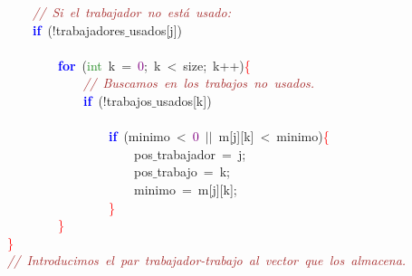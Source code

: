 \mbox{}\ \ \ \ \ \ \ \ \ \ \ \ \textit{\textcolor{Brown}{//\ Si\ el\ trabajador\ no\ está\ usado:\ }} \\
\mbox{}\ \ \ \ \ \ \ \ \ \ \ \ \textbf{\textcolor{Blue}{if}}\ \textcolor{BrickRed}{(!}trabajadores$\_$usados\textcolor{BrickRed}{[}j\textcolor{BrickRed}{])} \\
\mbox{} \\
\mbox{}\ \ \ \ \ \ \ \ \ \ \ \ \ \ \ \ \textbf{\textcolor{Blue}{for}}\ \textcolor{BrickRed}{(}\textcolor{ForestGreen}{int}\ k\ \textcolor{BrickRed}{=}\ \textcolor{Purple}{0}\textcolor{BrickRed}{;}\ k\ \textcolor{BrickRed}{\textless{}}\ size\textcolor{BrickRed}{;}\ k\textcolor{BrickRed}{++)}\textcolor{Red}{\{} \\
\mbox{}\ \ \ \ \ \ \ \ \ \ \ \ \ \ \ \ \ \ \ \ \textit{\textcolor{Brown}{//\ Buscamos\ en\ los\ trabajos\ no\ usados.\ }} \\
\mbox{}\ \ \ \ \ \ \ \ \ \ \ \ \ \ \ \ \ \ \ \ \textbf{\textcolor{Blue}{if}}\ \textcolor{BrickRed}{(!}trabajos$\_$usados\textcolor{BrickRed}{[}k\textcolor{BrickRed}{])} \\
\mbox{} \\
\mbox{}\ \ \ \ \ \ \ \ \ \ \ \ \ \ \ \ \ \ \ \ \ \ \ \ \textbf{\textcolor{Blue}{if}}\ \textcolor{BrickRed}{(}minimo\ \textcolor{BrickRed}{\textless{}}\ \textcolor{Purple}{0}\ \textcolor{BrickRed}{$|$$|$}\ m\textcolor{BrickRed}{[}j\textcolor{BrickRed}{][}k\textcolor{BrickRed}{]}\ \textcolor{BrickRed}{\textless{}}\ minimo\textcolor{BrickRed}{)}\textcolor{Red}{\{} \\
\mbox{}\ \ \ \ \ \ \ \ \ \ \ \ \ \ \ \ \ \ \ \ \ \ \ \ \ \ \ \ pos$\_$trabajador\ \textcolor{BrickRed}{=}\ j\textcolor{BrickRed}{;}\  \\
\mbox{}\ \ \ \ \ \ \ \ \ \ \ \ \ \ \ \ \ \ \ \ \ \ \ \ \ \ \ \ pos$\_$trabajo\ \textcolor{BrickRed}{=}\ k\textcolor{BrickRed}{;}\  \\
\mbox{}\ \ \ \ \ \ \ \ \ \ \ \ \ \ \ \ \ \ \ \ \ \ \ \ \ \ \ \ minimo\ \textcolor{BrickRed}{=}\ m\textcolor{BrickRed}{[}j\textcolor{BrickRed}{][}k\textcolor{BrickRed}{];}\  \\
\mbox{}\ \ \ \ \ \ \ \ \ \ \ \ \ \ \ \ \ \ \ \ \ \ \ \ \textcolor{Red}{\}} \\
\mbox{}\ \ \ \ \ \ \ \ \ \ \ \ \ \ \ \ \textcolor{Red}{\}} \\
\mbox{}\ \ \ \ \ \ \ \ \textcolor{Red}{\}} \\
\mbox{}\ \ \ \ \ \ \ \ \textit{\textcolor{Brown}{//\ Introducimos\ el\ par\ trabajador-trabajo\ al\ vector\ que\ los\ almacena.\ }} \\
